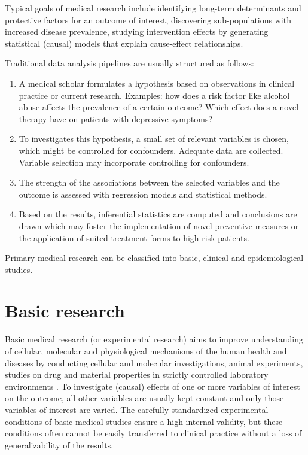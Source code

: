 \documentclass[
  oneside]{book}
\providecommand{\tightlist}{%
  \setlength{\itemsep}{0pt}\setlength{\parskip}{0pt}}
\begin{document}
Typical goals of medical research include identifying long-term determinants and protective factors for an outcome of interest, discovering sub-populations with increased disease prevalence, studying intervention effects by generating statistical (causal) models that explain cause-effect relationships.

Traditional data analysis pipelines are usually structured as follows:

\begin{enumerate}
\def\labelenumi{(\arabic{enumi})}
\tightlist
\item
  A medical scholar formulates a hypothesis based on observations in clinical practice or current research. Examples: how does a risk factor like alcohol abuse affects the prevalence of a certain outcome? Which effect does a novel therapy have on patients with depressive symptoms?
\item
  To investigates this hypothesis, a small set of relevant variables is chosen, which might be controlled for confounders.
  Adequate data are collected.
  Variable selection may incorporate controlling for confounders.
\item
  The strength of the associations between the selected variables and the outcome is assessed with regression models and statistical methods.
\item
  Based on the results, inferential statistics are computed and conclusions are drawn which may foster the implementation of novel preventive measures or the application of suited treatment forms to high-risk patients.
\end{enumerate}

Primary medical research can be classified into basic, clinical and epidemiological studies.

\hypertarget{basic-research}{%
\section{Basic research}\label{basic-research}}

Basic medical research (or experimental research) aims to improve understanding of cellular, molecular and physiological mechanisms of the human health and diseases by conducting cellular and molecular investigations, animal experiments, studies on drug and material properties in strictly controlled laboratory environments \autocite{Roehrig:Arztebl2009}.
To investigate (causal) effects of one or more variables of interest on the outcome, all other variables are usually kept constant and only those variables of interest are varied.
The carefully standardized experimental conditions of basic medical studies ensure a high internal validity, but these conditions often cannot be easily transferred to clinical practice without a loss of generalizability of the results.
\end{document}
